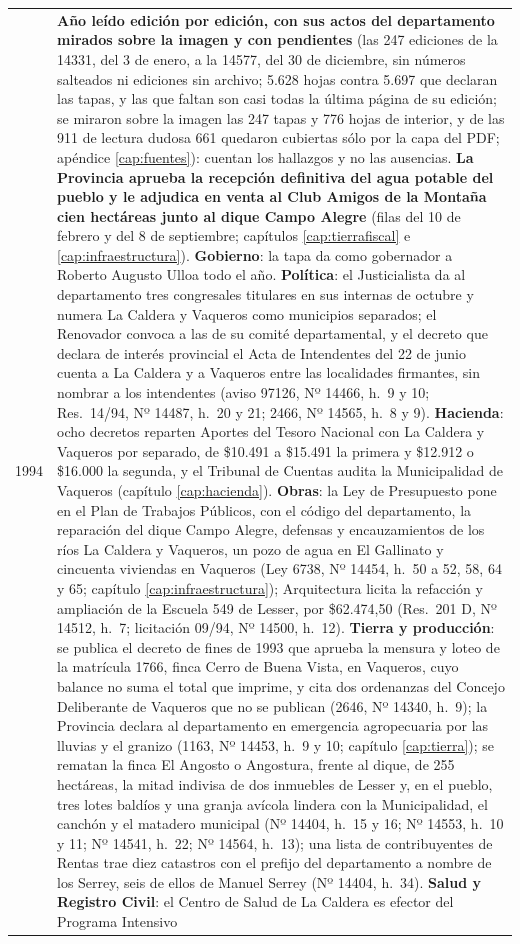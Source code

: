 \begin{longtable}{@{}p{2.7cm}p{10.3cm}@{}}
1994 & \textbf{Año leído edición por edición, con sus actos del departamento mirados sobre la imagen y con pendientes} (las 247 ediciones de la 14331, del 3 de enero, a la 14577, del 30 de diciembre, sin números salteados ni ediciones sin archivo; 5.628 hojas contra 5.697 que declaran las tapas, y las que faltan son casi todas la última página de su edición; se miraron sobre la imagen las 247 tapas y 776 hojas de interior, y de las 911 de lectura dudosa 661 quedaron cubiertas sólo por la capa del PDF; apéndice \ref{cap:fuentes}): cuentan los hallazgos y no las ausencias. \textbf{La Provincia aprueba la recepción definitiva del agua potable del pueblo y le adjudica en venta al Club Amigos de la Montaña cien hectáreas junto al dique Campo Alegre} (filas del 10 de febrero y del 8 de septiembre; capítulos \ref{cap:tierrafiscal} e \ref{cap:infraestructura}). \textbf{Gobierno}: la tapa da como gobernador a Roberto Augusto Ulloa todo el año. \textbf{Política}: el Justicialista da al departamento tres congresales titulares en sus internas de octubre y numera La Caldera y Vaqueros como municipios separados; el Renovador convoca a las de su comité departamental, y el decreto que declara de interés provincial el Acta de Intendentes del 22 de junio cuenta a La Caldera y a Vaqueros entre las localidades firmantes, sin nombrar a los intendentes (aviso 97126, Nº 14466, h.\ 9 y 10; Res.\ 14/94, Nº 14487, h.\ 20 y 21; 2466, Nº 14565, h.\ 8 y 9). \textbf{Hacienda}: ocho decretos reparten Aportes del Tesoro Nacional con La Caldera y Vaqueros por separado, de \$10.491 a \$15.491 la primera y \$12.912 o \$16.000 la segunda, y el Tribunal de Cuentas audita la Municipalidad de Vaqueros (capítulo \ref{cap:hacienda}). \textbf{Obras}: la Ley de Presupuesto pone en el Plan de Trabajos Públicos, con el código del departamento, la reparación del dique Campo Alegre, defensas y encauzamientos de los ríos La Caldera y Vaqueros, un pozo de agua en El Gallinato y cincuenta viviendas en Vaqueros (Ley 6738, Nº 14454, h.\ 50 a 52, 58, 64 y 65; capítulo \ref{cap:infraestructura}); Arquitectura licita la refacción y ampliación de la Escuela 549 de Lesser, por \$62.474,50 (Res.\ 201 D, Nº 14512, h.\ 7; licitación 09/94, Nº 14500, h.\ 12). \textbf{Tierra y producción}: se publica el decreto de fines de 1993 que aprueba la mensura y loteo de la matrícula 1766, finca Cerro de Buena Vista, en Vaqueros, cuyo balance no suma el total que imprime, y cita dos ordenanzas del Concejo Deliberante de Vaqueros que no se publican (2646, Nº 14340, h.\ 9); la Provincia declara al departamento en emergencia agropecuaria por las lluvias y el granizo (1163, Nº 14453, h.\ 9 y 10; capítulo \ref{cap:tierra}); se rematan la finca El Angosto o Angostura, frente al dique, de 255 hectáreas, la mitad indivisa de dos inmuebles de Lesser y, en el pueblo, tres lotes baldíos y una granja avícola lindera con la Municipalidad, el canchón y el matadero municipal (Nº 14404, h.\ 15 y 16; Nº 14553, h.\ 10 y 11; Nº 14541, h.\ 22; Nº 14564, h.\ 13); una lista de contribuyentes de Rentas trae diez catastros con el prefijo del departamento a nombre de los Serrey, seis de ellos de Manuel Serrey (Nº 14404, h.\ 34). \textbf{Salud y Registro Civil}: el Centro de Salud de La Caldera es efector del Programa Intensivo 
\end{longtable}
